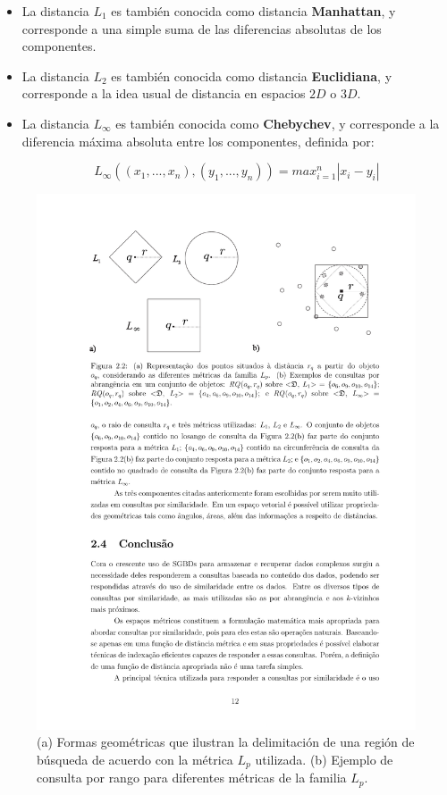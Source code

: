 \begin{itemize}

\item La distancia $L_1$ es también conocida como distancia \textbf{Manhattan}, y corresponde a una  simple suma de las diferencias absolutas de los componentes.

\item La distancia $L_2$ es también conocida como distancia \textbf{Euclidiana}, y corresponde a la idea usual de distancia en espacios $2D$ o $3D$.

\item La distancia $L_{\infty}$ es también conocida como \textbf{Chebychev}, y corresponde a la diferencia máxima absoluta entre los componentes, definida por:

\begin{equation}
   L_{\infty} ((x_1,...,x_n), (y_1,...,y_n)) = max_{i=1}^{n} |x_i - y_i|
\end{equation}

\end{itemize}

\begin{figure}[htp]
\centering
\includegraphics[width=0.9\columnwidth]{images/lpnorms.pdf}
\caption{(a) Formas geométricas que ilustran la delimitación de una  región de búsqueda de acuerdo con la métrica $L_p$ utilizada. (b) Ejemplo de consulta por rango para diferentes métricas de la  familia $L_p$.}
\label{fig:lpnorms}
\end{figure}

